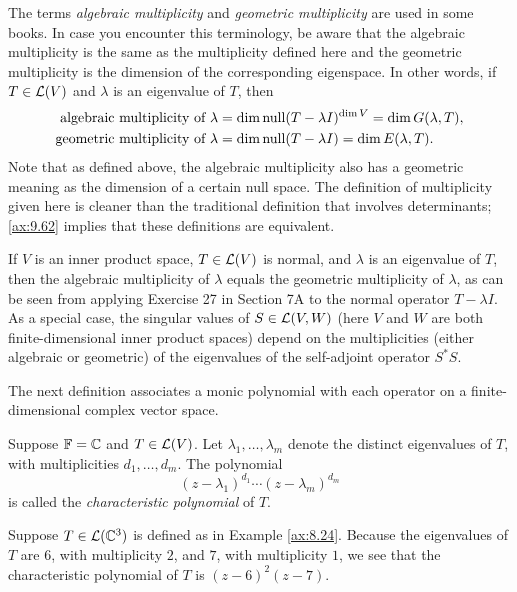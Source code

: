 The terms \emph{algebraic multiplicity} and \emph{geometric multiplicity} are
used in some books. In case you encounter this terminology, be aware that the
algebraic multiplicity is the same as the multiplicity defined here and the
geometric multiplicity is the dimension of the corresponding eigenspace. In
other words, if $T\in\mathcal{L}(V)$ and $\lambda$ is an eigenvalue of $T$, then
\begin{align*}
\text{algebraic multiplicity of } \lambda
  &= \operatorname{dim}\operatorname{null}(T-\lambda I)^{\operatorname{dim} V} = \operatorname{dim} G(\lambda,T),\\
\text{geometric multiplicity of } \lambda
  &= \operatorname{dim}\operatorname{null}(T-\lambda I) = \operatorname{dim} E(\lambda,T).
\end{align*}
Note that as defined above, the algebraic multiplicity also has a geometric
meaning as the dimension of a certain null space. The definition of
multiplicity given here is cleaner than the traditional definition that
involves determinants; \ref{ax:9.62} implies that these definitions are
equivalent.

If $V$ is an inner product space, $T\in\mathcal{L}(V)$ is normal, and $\lambda$ is an
eigenvalue of $T$, then the algebraic multiplicity of $\lambda$ equals the
geometric multiplicity of $\lambda$, as can be seen from applying Exercise 27
in Section 7A to the normal operator $T-\lambda I$. As a special case, the
singular values of $S\in\mathcal{L}(V,W)$ (here $V$ and $W$ are both
finite-dimensional inner product spaces) depend on the multiplicities (either
algebraic or geometric) of the eigenvalues of the self-adjoint operator
$S^*S$.

The next definition associates a monic polynomial with each operator on a
finite-dimensional complex vector space.

\begin{definition}\label{ax:8.26}
Suppose $\mathbb{F}=\mathbb{C}$ and $T\in\mathcal{L}(V)$. Let $\lambda_1,\dots,\lambda_m$ denote the
distinct eigenvalues of $T$, with multiplicities $d_1,\dots,d_m$. The
polynomial
\[ (z-\lambda_1)^{d_1}\cdots(z-\lambda_m)^{d_m} \]
is called the \emph{characteristic polynomial} of $T$.
\end{definition}

\begin{example}\label{ax:8.27}
Suppose $T\in\mathcal{L}(\mathbb{C}^3)$ is defined as in Example \ref{ax:8.24}. Because the
eigenvalues of $T$ are $6$, with multiplicity $2$, and $7$, with multiplicity
$1$, we see that the characteristic polynomial of $T$ is $(z-6)^2(z-7)$.
\end{example}


